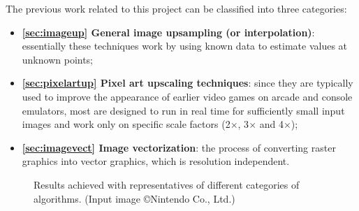 \documentclass[]{usiinfbachelorproject}
\begin{document}
The previous work related to this project can be classified into three categories:
\begin{itemize}
	\item {\bf \ref{sec:imageup} General image upsampling (or interpolation)}: essentially these techniques work by using known data to estimate values at unknown points;
	\item {\bf \ref{sec:pixelartup} Pixel art upscaling techniques}: since they are typically used to improve the appearance of earlier video games on arcade and console emulators, most are designed to run in real time for sufficiently small input images and work only on specific scale factors (2$\times$, 3$\times$ and 4$\times$);
	\item {\bf \ref{sec:imagevect} Image vectorization}: the process of converting raster graphics into vector graphics, which is resolution independent.
\end{itemize}

\begin{figure}[ht]
	\centering
	\caption{Results achieved with representatives of different categories of algorithms. (Input image \copyright Nintendo Co., Ltd.)}
\end{figure}
\end{document}
